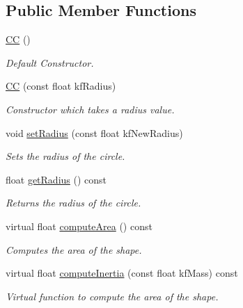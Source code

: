 \subsection*{Public Member Functions}
\begin{DoxyCompactItemize}
\item 
\hypertarget{class_c_c_a09cb54259760c46d58d5cb8719601af6}{\hyperlink{class_c_c_a09cb54259760c46d58d5cb8719601af6}{C\+C} ()}\label{class_c_c_a09cb54259760c46d58d5cb8719601af6}

\begin{DoxyCompactList}\small\item\em Default Constructor. \end{DoxyCompactList}\item 
\hyperlink{class_c_c_a4b3878b1ed23af886332d5d6d62d65c8}{C\+C} (const float kf\+Radius)
\begin{DoxyCompactList}\small\item\em Constructor which takes a radius value. \end{DoxyCompactList}\item 
void \hyperlink{class_c_c_a9b26f4420fa65278f93048ae62d4c154}{set\+Radius} (const float kf\+New\+Radius)
\begin{DoxyCompactList}\small\item\em Sets the radius of the circle. \end{DoxyCompactList}\item 
float \hyperlink{class_c_c_afe5cabbff942a13f20f5882258309fe3}{get\+Radius} () const 
\begin{DoxyCompactList}\small\item\em Returns the radius of the circle. \end{DoxyCompactList}\item 
virtual float \hyperlink{class_c_c_a26a40233a1bc78cd70bdcaff15ebc032}{compute\+Area} () const 
\begin{DoxyCompactList}\small\item\em Computes the area of the shape. \end{DoxyCompactList}\item 
\hypertarget{class_c_c_ac42c8589b3d366c4571c3898baa27b88}{virtual float \hyperlink{class_c_c_ac42c8589b3d366c4571c3898baa27b88}{compute\+Inertia} (const float kf\+Mass) const }\label{class_c_c_ac42c8589b3d366c4571c3898baa27b88}

\begin{DoxyCompactList}\small\item\em Virtual function to compute the area of the shape. \end{DoxyCompactList}\end{DoxyCompactItemize}
